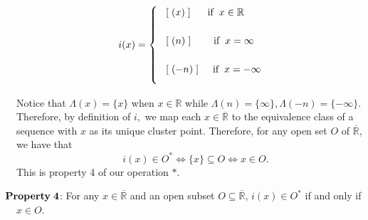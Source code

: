 \documentclass{amsart}
\theoremstyle{definition}
\theoremstyle{plain}
\begin{document}
$$i(x)=
\begin{cases}

\vspace{5mm}


\hspace{3mm} [\hspace{1mm}(x)\hspace{1mm}] \hspace{6mm} \text{if} \hspace{2mm} x \in \mathbb{R} \\

\vspace{5mm}


\hspace{3mm} [\hspace{1mm}(n) \hspace{1mm}] \hspace{8mm} \text{if} \hspace{2mm} x = \infty \\

\vspace{3mm}

\hspace{3mm} [\hspace{1mm}(-n) \hspace{1mm}] \hspace{5mm} \text{if} \hspace{2mm} x = -\infty \\
\end{cases}$$


Notice that $\Lambda(x) = \{x\}$ when $x \in \mathbb{R}$ while $\Lambda(n) = \{\infty\}, \Lambda(-n) = \{-\infty\}$. Therefore, by definition of $i,$ we map each $x \in \overline{\mathbb{R}}$ to the equivalence class of a sequence with $x$ as its unique cluster point.
Therefore, for any open set $O$ of $\overline{\mathbb{R}}$, we have that $$i(x) \in O^* \iff \{x\} \subseteq O \iff x \in O.$$ This is property 4 of our 
operation $*$. 
\par\medskip

$\hspace{-4mm} \mathbf{Property \hspace{1mm} 4}$: For any $x \in \overline{\mathbb{R}}$ and an open subset $O \subseteq \overline{\mathbb{R}}$, $i(x) \in O^*$ 
if and only if $x \in O.$ \\
\end{document}

